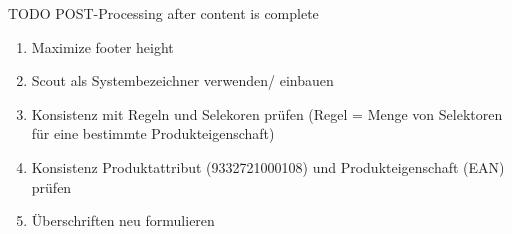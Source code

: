 TODO POST-Processing after content is complete

\begin{enumerate}
    \item Maximize footer height
    \item Scout als Systembezeichner verwenden/ einbauen
    \item Konsistenz mit Regeln und Selekoren prüfen (Regel = Menge von Selektoren für eine bestimmte Produkteigenschaft)
    \item Konsistenz Produktattribut (9332721000108) und Produkteigenschaft (EAN) prüfen
    \item Überschriften neu formulieren
\end{enumerate}